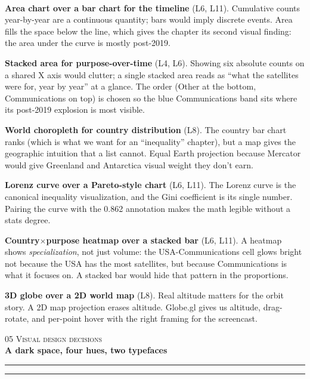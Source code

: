 \documentclass[9pt,a4paper]{article}
\newcommand{\eyebrow}[1]{{\footnotesize\textcolor{accentBlue}{\textsc{#1}}}}
\newcommand{\pageheader}[3]{%
  {\eyebrow{#1 \quad\textbullet\quad #2}}\\[3pt]%
  {\Large\bfseries #3}\\[3pt]%
  {\color{accentBlue}\rule{4em}{1.5pt}}\hspace{1pt}%
  {\color{accentBlue!28}\rule{\dimexpr\linewidth-4em-1pt\relax}{0.5pt}}\\[4pt]%
}
\newcommand{\subhead}[1]{%
  \vspace{4pt}%
  \noindent\tcbox[
    on line,
    colback=accentBlue!10!white, colframe=accentBlue,
    boxrule=0.3pt, arc=2.5pt,
    left=7pt, right=7pt, top=0.5pt, bottom=0.5pt,
  ]{\small\bfseries\color{accentBlue!85!black}#1}\\[2pt]%
}
\begin{document}
\subhead{Why these chart types, specifically}

\textbf{Area chart over a bar chart for the timeline} (L6, L11). Cumulative counts year-by-year are a continuous quantity; bars would imply discrete events. Area fills the space below the line, which gives the chapter its second visual finding: the area under the curve is mostly post-2019.

\textbf{Stacked area for purpose-over-time} (L4, L6). Showing six absolute counts on a shared X axis would clutter; a single stacked area reads as ``what the satellites were for, year by year'' at a glance. The order (Other at the bottom, Communications on top) is chosen so the blue Communications band sits where its post-2019 explosion is most visible.

\textbf{World choropleth for country distribution} (L8). The country bar chart ranks (which is what we want for an ``inequality'' chapter), but a map gives the geographic intuition that a list cannot. Equal Earth projection because Mercator would give Greenland and Antarctica visual weight they don't earn.

\textbf{Lorenz curve over a Pareto-style chart} (L6, L11). The Lorenz curve is the canonical inequality visualization, and the Gini coefficient is its single number. Pairing the curve with the 0.862 annotation makes the math legible without a stats degree.

\textbf{Country$\times$purpose heatmap over a stacked bar} (L6, L11). A heatmap shows \textit{specialization}, not just volume: the USA-Communications cell glows bright not because the USA has the most satellites, but because Communications is what it focuses on. A stacked bar would hide that pattern in the proportions.

\textbf{3D globe over a 2D world map} (L8). Real altitude matters for the orbit story. A 2D map projection erases altitude. Globe.gl gives us altitude, drag-rotate, and per-point hover with the right framing for the screencast.

\vspace{18pt}


\pageheader{05}{Visual design decisions}{A dark space, four hues, two typefaces}

\vspace{2pt}
\end{document}
